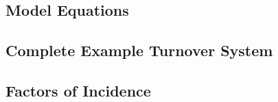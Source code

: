 
\subsection{Model Equations}\label{aa:eqs-model}

\subsection{Complete Example Turnover System}\label{aa:eqs-turnover}

\subsection{Factors of Incidence}\label{aa:eqs-incidence}

